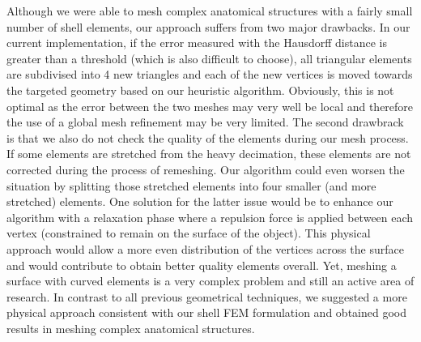 Although we were able to mesh complex anatomical structures with a fairly small number of shell elements, our approach suffers from two major drawbacks. In our current implementation, if the error measured with the Hausdorff distance is greater than a threshold (which is also difficult to choose), all triangular elements are subdivised into 4 new triangles and each of the new vertices is moved towards the targeted geometry based on our heuristic algorithm. Obviously, this is not optimal as the error between the two meshes may very well be local and therefore the use of a global mesh refinement may be very limited. The second drawbrack is that we also do not check the quality of the elements during our mesh process. If some elements are stretched from the heavy decimation, these elements are not corrected during the process of remeshing. Our algorithm could even worsen the situation by splitting those stretched elements into four smaller (and more stretched) elements. One solution for the latter issue would be to enhance our algorithm with a relaxation phase where a repulsion force is applied between each vertex (constrained to remain on the surface of the object). This physical approach would allow a more even distribution of the vertices across the surface and would contribute to obtain better quality elements overall. Yet, meshing a surface with curved elements is a very complex problem and still an active area of research. In contrast to all previous geometrical techniques, we suggested a more physical approach consistent with our shell FEM formulation and obtained good results in meshing complex anatomical structures. 

